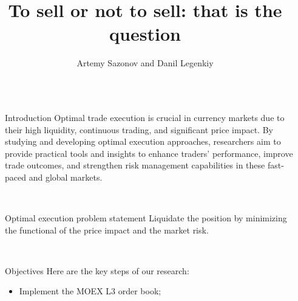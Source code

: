 \documentclass[]{beamer}
\title{To sell or not to sell: that is the question}
\author{Artemy Sazonov and Danil Legenkiy}
\begin{document}
\nocite{*} %

\begin{frame}[t]
    \begin{columns}[t] %
     
    \begin{column}{\lrmargin}\end{column} %
    
    \begin{column}{\onecolwid} %
     
    
    \begin{block}{Introduction}
        Optimal trade execution is crucial in currency markets due to their high liquidity, continuous trading, and significant price impact. By studying and developing optimal execution approaches, researchers aim to provide practical tools and insights to enhance traders' performance, improve trade outcomes, and strengthen risk management capabilities in these fast-paced and global markets.
    \end{block}
    
        
    \

    \begin{block}{Optimal execution problem statement}
        Liquidate the position by minimizing the functional of the price impact and the market risk. 
    \end{block}

    \

    \begin{alertblock}{Objectives}
    Here are the key steps of our research:
    \begin{itemize}
        \item Implement the MOEX L3 order book;


\end{itemize}
\end{alertblock}
\end{column}
\end{columns}
\end{frame}
\end{document}
